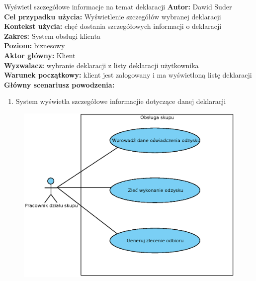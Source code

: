 \begin{usecase}{Wyświetl szczegółowe informacje na temat deklaracji}
	\textbf{Autor:} Dawid Suder \\
	\textbf{Cel przypadku użycia:} Wyświetlenie szczegółów wybranej deklaracji \\
	\textbf{Kontekst użycia:} chęć dostania szczegółowych informacji o deklaracji\\
	\textbf{Zakres:} System obsługi klienta \\
	\textbf{Poziom:} biznesowy \\
	\textbf{Aktor główny:} Klient\\
	\textbf{Wyzwalacz:} wybranie deklaracji z listy deklaracji użytkownika \\
	\textbf{Warunek początkowy:} klient jest zalogowany i ma wyświetloną listę deklaracji\\
	\textbf{Główny scenariusz powodzenia:} \\
		\begin{enumerate}
			\item System wyświetla szczegółowe informacjie dotyczące danej deklaracji
		\end{enumerate}
\end{usecase}

\begin{figure}[H]
	\centering
	\includegraphics[width=.8\textwidth]{img/UC/skup.eps}
\end{figure}

